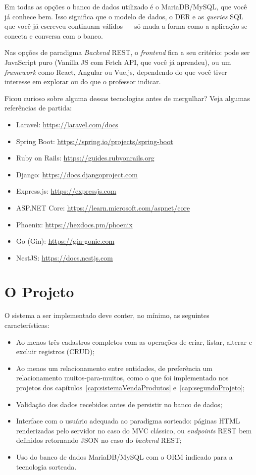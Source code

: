 Em todas as opções o banco de dados utilizado é o MariaDB/MySQL, que você já conhece bem. Isso significa que o modelo de dados, o DER e as \textit{queries} SQL que você já escreveu continuam válidos --- só muda a forma como a aplicação se conecta e conversa com o banco.

Nas opções de paradigma \textit{Backend} REST, o \textit{frontend} fica a seu critério: pode ser JavaScript puro (Vanilla JS com Fetch API, que você já aprendeu), ou um \textit{framework} como React, Angular ou Vue.js, dependendo do que você tiver interesse em explorar ou do que o professor indicar.

\begin{saibaMais}
    Ficou curioso sobre alguma dessas tecnologias antes de mergulhar? Veja algumas referências de partida:
    \begin{itemize}
        \item Laravel: \url{https://laravel.com/docs}
        \item Spring Boot: \url{https://spring.io/projects/spring-boot}
        \item Ruby on Rails: \url{https://guides.rubyonrails.org}
        \item Django: \url{https://docs.djangoproject.com}
        \item Express.js: \url{https://expressjs.com}
        \item ASP.NET Core: \url{https://learn.microsoft.com/aspnet/core}
        \item Phoenix: \url{https://hexdocs.pm/phoenix}
        \item Go (Gin): \url{https://gin-gonic.com}
        \item NestJS: \url{https://docs.nestjs.com}
    \end{itemize}
\end{saibaMais}


\section{O Projeto}

O sistema a ser implementado deve conter, no mínimo, as seguintes características:

\begin{itemize}
    \item Ao menos três cadastros completos com as operações de criar, listar, alterar e excluir registros (CRUD);
    \item Ao menos um relacionamento entre entidades, de preferência um relacionamento muitos-para-muitos, como o que foi implementado nos projetos dos capítulos~\ref{cap:sistemaVendaProdutos} e~\ref{cap:segundoProjeto};
    \item Validação dos dados recebidos antes de persistir no banco de dados;
    \item Interface com o usuário adequada ao paradigma sorteado: páginas HTML renderizadas pelo servidor no caso do MVC clássico, ou \textit{endpoints} REST bem definidos retornando JSON no caso do \textit{backend} REST;
    \item Uso do banco de dados MariaDB/MySQL com o ORM indicado para a tecnologia sorteada.
\end{itemize}

